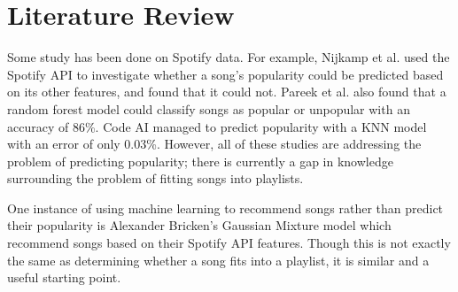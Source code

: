 \documentclass{article}
\begin{document}
\section{Literature Review}
Some study has been done on Spotify data. For example, Nijkamp et al. used the Spotify API
to investigate whether a song's popularity could be predicted based on its other features, and found
that it could not. Pareek et al. also found that a random forest model could classify songs
as popular or unpopular with an accuracy of 86\%. Code AI managed to predict popularity with a KNN
model with an error of only 0.03\%. However, all of these studies are addressing the problem
of predicting popularity; there is currently a gap in knowledge surrounding the problem of fitting
songs into playlists. 

One instance of using machine learning to recommend songs rather than predict their popularity is
Alexander Bricken's Gaussian Mixture model which recommend songs based on their Spotify API
features. Though this is not exactly the same as determining whether a song fits into a playlist,
it is similar and a useful starting point.
\end{document}
